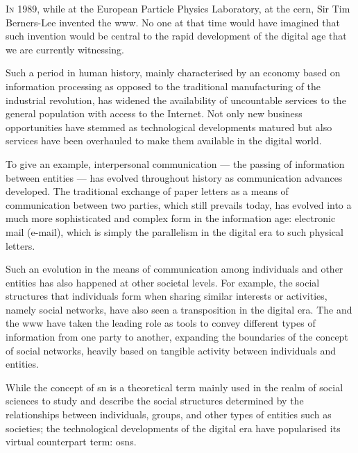 

\lettrine{\textcolor[gray]{.25}{I}}{n} 1989, while at the European Particle Physics 
Laboratory, at the \acf{cern}, Sir Tim Berners-Lee invented the \Ac{www}. No one 
at that time would have imagined that such invention would be central to the rapid 
development of the digital age that we are currently witnessing.

Such a period in human history, mainly characterised by an economy based on information 
processing as opposed to the traditional manufacturing of the industrial revolution, 
has widened the availability of uncountable services to the general population with 
access to the Internet. Not only new business opportunities have stemmed as technological 
developments matured but also services have been overhauled to make them available 
in the digital world.

To give an example, interpersonal communication --- the passing of information between 
entities --- has evolved throughout history as communication advances developed. 
The traditional exchange of paper letters as a means of communication between two 
parties, which still prevails today, has evolved into a much more sophisticated 
and complex form in the information age: electronic mail (e-mail), which is simply 
the parallelism in the digital era to such physical letters.

Such an evolution in the means of communication among individuals and other entities 
has also happened at other societal levels. For example, the social structures that 
individuals form when sharing similar interests or activities, namely social networks, 
have also seen a transposition in the digital era. The \Internet and the \ac{www} 
have taken the leading role as tools to convey different types of information from 
one party to another, expanding the boundaries of the concept of social networks, 
heavily based on tangible activity between individuals and entities.

While the concept of \acl{sn} is a theoretical term mainly used in the realm of 
social sciences to study and describe the social structures determined by the relationships 
between individuals, groups, and other types of entities such as societies; the 
technological developments of the digital era have popularised its virtual counterpart 
term: \aclp{osn}.

